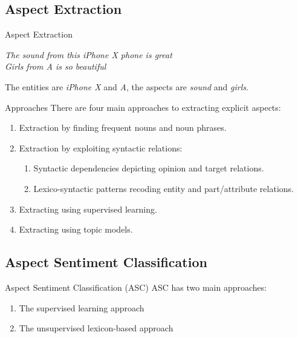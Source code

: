 \documentclass[xcolor=table]{beamer}
\begin{document}
\subsection{Aspect Extraction}
\begin{frame}{Aspect Extraction}
    \begin{example}
        \textit{The sound from this iPhone X phone is great} \\
        \textit{Girls from A is so beautiful}
    \end{example}
    
    The entities are \textit{iPhone X} and \textit{A}, the aspects are \textit{sound} and \textit{girls}.
    \pause
    
    \begin{block}{Approaches }
        There are four main approaches to extracting explicit aspects:
        \begin{enumerate}
            \item Extraction by finding frequent nouns and noun phrases.
            \item Extraction by exploiting syntactic relations:
            \begin{enumerate}
                \item Syntactic dependencies depicting opinion and target relations.
                \item Lexico-syntactic patterns recoding entity and part/attribute relations.
            \end{enumerate}
            \item Extracting using supervised learning.
            \item Extracting using topic models.
        \end{enumerate}
    \end{block}
\end{frame}

\subsection{Aspect Sentiment Classification}
\begin{frame}{Aspect Sentiment Classification (ASC)}
    ASC has two main approaches:
    \begin{enumerate}
        \item The supervised learning approach
        \item The unsupervised lexicon-based approach
    \end{enumerate}
\end{frame}
\end{document}
